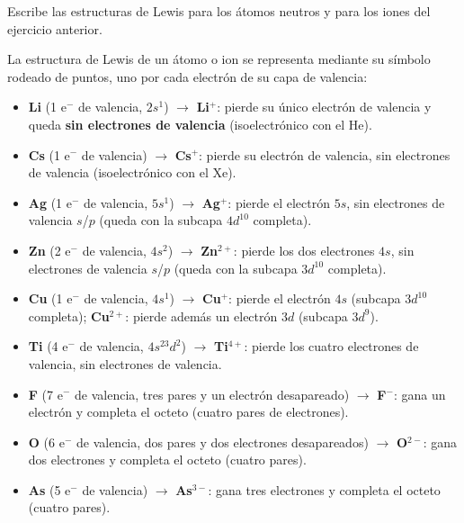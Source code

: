 \begin{exercise}
    Escribe las estructuras de Lewis para los átomos neutros y para los iones del ejercicio anterior.
    \begin{solu}

        La estructura de Lewis de un átomo o ion se representa mediante su símbolo rodeado de puntos, uno por cada electrón de su capa de valencia:

        \begin{itemize}
            \item \textbf{Li} (1 e\(^-\) de valencia, \(2s^1\)) \(\rightarrow\) \textbf{Li\(^+\)}: pierde su único electrón de valencia y queda \textbf{sin electrones de valencia} (isoelectrónico con el He).
            \item \textbf{Cs} (1 e\(^-\) de valencia) \(\rightarrow\) \textbf{Cs\(^+\)}: pierde su electrón de valencia, sin electrones de valencia (isoelectrónico con el Xe).
            \item \textbf{Ag} (1 e\(^-\) de valencia, \(5s^1\)) \(\rightarrow\) \textbf{Ag\(^+\)}: pierde el electrón \(5s\), sin electrones de valencia \(s\)/\(p\) (queda con la subcapa \(4d^{10}\) completa).
            \item \textbf{Zn} (2 e\(^-\) de valencia, \(4s^2\)) \(\rightarrow\) \textbf{Zn\(^{2+}\)}: pierde los dos electrones \(4s\), sin electrones de valencia \(s\)/\(p\) (queda con la subcapa \(3d^{10}\) completa).
            \item \textbf{Cu} (1 e\(^-\) de valencia, \(4s^1\)) \(\rightarrow\) \textbf{Cu\(^+\)}: pierde el electrón \(4s\) (subcapa \(3d^{10}\) completa); \textbf{Cu\(^{2+}\)}: pierde además un electrón \(3d\) (subcapa \(3d^9\)).
            \item \textbf{Ti} (4 e\(^-\) de valencia, \(4s^23d^2\)) \(\rightarrow\) \textbf{Ti\(^{4+}\)}: pierde los cuatro electrones de valencia, sin electrones de valencia.
            \item \textbf{F} (7 e\(^-\) de valencia, tres pares y un electrón desapareado) \(\rightarrow\) \textbf{F\(^-\)}: gana un electrón y completa el octeto (cuatro pares de electrones).
            \item \textbf{O} (6 e\(^-\) de valencia, dos pares y dos electrones desapareados) \(\rightarrow\) \textbf{O\(^{2-}\)}: gana dos electrones y completa el octeto (cuatro pares).
            \item \textbf{As} (5 e\(^-\) de valencia) \(\rightarrow\) \textbf{As\(^{3-}\)}: gana tres electrones y completa el octeto (cuatro pares).

\end{itemize}
\end{solu}
\end{exercise}
